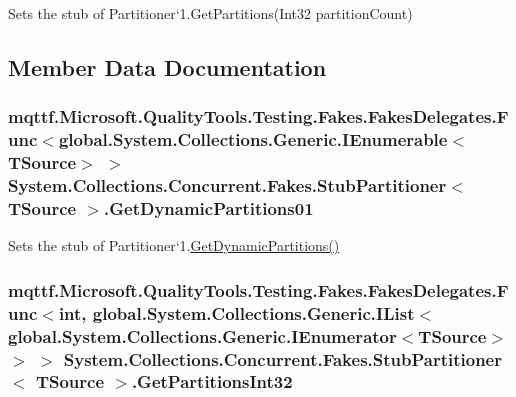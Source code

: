 Sets the stub of Partitioner`1.Get\-Partitions(\-Int32 partition\-Count)



\subsection{Member Data Documentation}
\hypertarget{class_system_1_1_collections_1_1_concurrent_1_1_fakes_1_1_stub_partitioner_3_01_t_source_01_4_a6521d1146acffb9e3bf5c4cfac8d53e0}{
\subsubsection[{Get\-Dynamic\-Partitions01}]{\setlength{\rightskip}{0pt plus 5cm}mqttf.\-Microsoft.\-Quality\-Tools.\-Testing.\-Fakes.\-Fakes\-Delegates.\-Func$<$global.\-System.\-Collections.\-Generic.\-I\-Enumerable$<$T\-Source$>$ $>$ System.\-Collections.\-Concurrent.\-Fakes.\-Stub\-Partitioner$<$ T\-Source $>$.Get\-Dynamic\-Partitions01}}\label{class_system_1_1_collections_1_1_concurrent_1_1_fakes_1_1_stub_partitioner_3_01_t_source_01_4_a6521d1146acffb9e3bf5c4cfac8d53e0}


Sets the stub of Partitioner`1.\hyperlink{class_system_1_1_collections_1_1_concurrent_1_1_fakes_1_1_stub_partitioner_3_01_t_source_01_4_a6732f39d910198eed65fa3b0d9d25af3}{Get\-Dynamic\-Partitions()}

\hypertarget{class_system_1_1_collections_1_1_concurrent_1_1_fakes_1_1_stub_partitioner_3_01_t_source_01_4_a1864ec285130bd00b85635682c51dfb4}{
\subsubsection[{Get\-Partitions\-Int32}]{\setlength{\rightskip}{0pt plus 5cm}mqttf.\-Microsoft.\-Quality\-Tools.\-Testing.\-Fakes.\-Fakes\-Delegates.\-Func$<$int, global.\-System.\-Collections.\-Generic.\-I\-List$<$global.\-System.\-Collections.\-Generic.\-I\-Enumerator$<$T\-Source$>$ $>$ $>$ System.\-Collections.\-Concurrent.\-Fakes.\-Stub\-Partitioner$<$ T\-Source $>$.Get\-Partitions\-Int32}}\label{class_system_1_1_collections_1_1_concurrent_1_1_fakes_1_1_stub_partitioner_3_01_t_source_01_4_a1864ec285130bd00b85635682c51dfb4}


